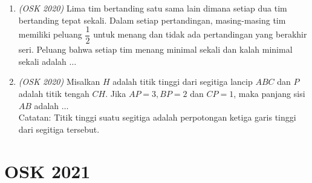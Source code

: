 \begin{enumerate}
	\item \textit{(OSK 2020)} Lima tim bertanding satu sama lain dimana setiap dua tim bertanding tepat sekali. Dalam setiap pertandingan, masing-masing tim memiliki peluang $\dfrac{1}{2}$ untuk menang dan tidak ada pertandingan yang berakhir seri. Peluang  bahwa setiap tim menang minimal sekali dan kalah minimal sekali adalah $\dots$
	
	\item \textit{(OSK 2020)} Misalkan $H$ adalah titik tinggi dari segitiga lancip $ABC$ dan $P$ adalah titik tengah $CH$. Jika $AP = 3, BP = 2$ dan $CP = 1$, maka panjang sisi $AB$ adalah $\dots$
	\\
	Catatan: Titik tinggi suatu segitiga adalah perpotongan ketiga garis tinggi dari segitiga tersebut.
\end{enumerate}
\newpage
\section{OSK 2021}


